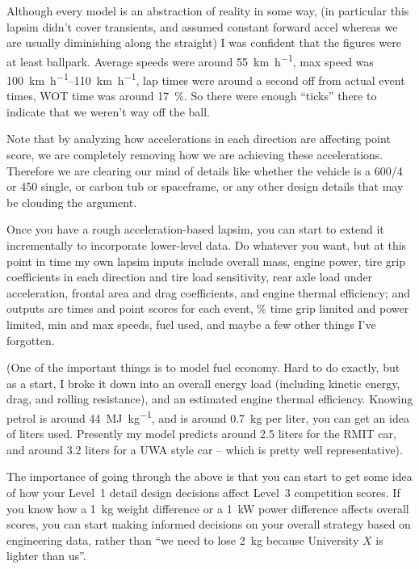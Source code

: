 \documentclass[10pt, a4paper, article, oneside, twocolumn, final]{memoir}
\begin{document}
Although every model is an abstraction of reality in some way, (in particular this lapsim didn’t cover transients, and assumed constant forward accel whereas we are usually diminishing along the straight) I was confident that the figures were at least ballpark. Average speeds were around \SI{55}{\kilo\metre\per\hour}, max speed was \SIrange{100}{110}{\kilo\metre\per\hour}, lap times were around a second off from actual event times, WOT time was around \SI{17}{\percent}. So there were enough “ticks” there to indicate that we weren’t way off the ball. 

Note that by analyzing how accelerations in each direction are affecting point score, we are completely removing how we are achieving these accelerations. Therefore we are clearing our mind of details like whether the vehicle is a \num{600/4} or \num{450} single, or carbon tub or spaceframe, or any other design details that may be clouding the argument. 

Once you have a rough acceleration-based lapsim, you can start to extend it incrementally to incorporate lower-level data. Do whatever you want, but at this point in time my own lapsim inputs include overall mass, engine power, tire grip coefficients in each direction and tire load sensitivity, rear axle load under acceleration, frontal area and drag coefficients, and engine thermal efficiency; and outputs are times and point scores for each event, \si{\percent} time grip limited and power limited, min and max speeds, fuel used, and maybe a few other things I’ve forgotten. 

(One of the important things is to model fuel economy. Hard to do exactly, but as a start, I broke it down into an overall energy load (including kinetic energy, drag, and rolling resistance), and an estimated engine thermal efficiency. Knowing petrol is around \SI{44}{\mega\joule\per\kilogram}, and is around \SI{0.7}{\kilogram} per liter, you can get an idea of liters used. Presently my model predicts around \num{2.5} liters for the RMIT car, and around \num{3.2} liters for a UWA style car -- which is pretty well representative). 

The importance of going through the above is that you can start to get some idea of how your Level~1 detail design decisions affect Level~3 competition scores. If you know how a \SI{1}{\kilogram} weight difference or a \SI{1}{\kilo\watt} power difference affects overall scores, you can start making informed decisions on your overall strategy based on engineering data, rather than “we need to lose \SI{2}{\kilogram} because University $X$ is lighter than us”. 
\end{document}
